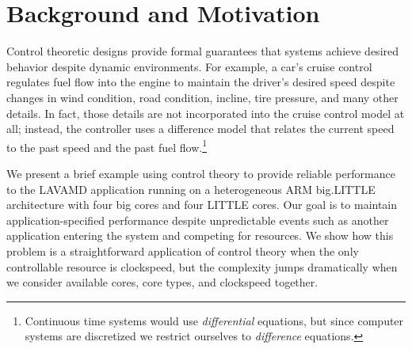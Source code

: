 \section{Background and Motivation}
\label{sec:example}
Control theoretic designs provide formal guarantees that systems
achieve desired behavior despite dynamic environments. For example, a
car's cruise control regulates fuel flow into the engine to maintain
the driver's desired speed despite changes in wind condition, road
condition, incline, tire pressure, and many other details.  In fact,
those details are not incorporated into the cruise control model at
all; instead, the controller uses a difference model that relates the
current speed to the past speed and the past fuel
flow.\footnote{Continuous time systems would use \emph{differential}
  equations, but since computer systems are discretized we restrict
  ourselves to \emph{difference} equations.}

We present a brief example using control theory to provide reliable
performance to the LAVAMD application running on a heterogeneous ARM
big.LITTLE architecture with four big cores and four LITTLE cores.
Our goal is to maintain application-specified performance despite
unpredictable events such as another application entering the system
and competing for resources.  We show how this problem is a
straightforward application of control theory when the only
controllable resource is clockspeed, but the complexity jumps
dramatically when we consider available cores, core types, and
clockspeed together.


